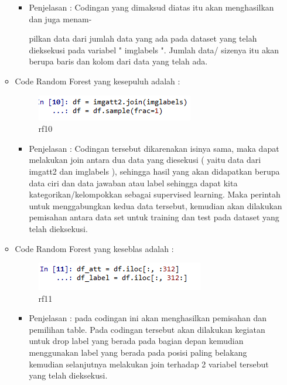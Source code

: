 \begin{enumerate}
\begin{itemize}
\begin{itemize}
\item Penjelasan : Codingan yang dimaksud diatas itu  akan menghasilkan dan juga menam-
\par pilkan data dari jumlah data yang ada pada dataset yang telah dieksekusi pada variabel " imglabels ". Jumlah data/ sizenya itu akan berupa baris dan kolom dari data yang telah ada.
\par
\par
\end{itemize}
\item Code Random Forest yang kesepuluh adalah :
\par
\begin{figure}[ht]
\centering
\includegraphics[scale=0.2]{figures/rf10.png}
\caption{rf10}
\label{contoh}
\end{figure}
\par
\begin{itemize}
\item Penjelasan : Codingan tersebut dikarenakan isinya sama, maka dapat melakukan join antara dua data yang diesekusi ( yaitu data dari imgatt2 dan imglabels ), sehingga hasil yang akan didapatkan berupa data ciri dan data jawaban atau label sehingga dapat kita  kategorikan/kelompokkan sebagai supervised learning. Maka perintah untuk menggabungkan kedua data tersebut, kemudian akan dilakukan pemisahan antara data set untuk training dan test pada dataset yang telah dieksekusi.
\par
\par
\end{itemize}
\item Code Random Forest yang keseblas adalah :
\par
\begin{figure}[ht]
\centering
\includegraphics[scale=0.2]{figures/rf11.png}
\caption{rf11}
\label{contoh}
\end{figure}
\par
\begin{itemize}
\item Penjelasan : pada codingan ini akan menghasilkan pemisahan dan pemilihan table. Pada codingan tersebut akan  dilakukan kegiatan untuk drop label yang berada pada bagian depan kemudian menggunakan label yang berada pada posisi paling belakang kemudian selanjutnya melakukan join terhadap 2 variabel tersebut yang telah dieksekusi.

\end{itemize}
\end{itemize}
\end{enumerate}
